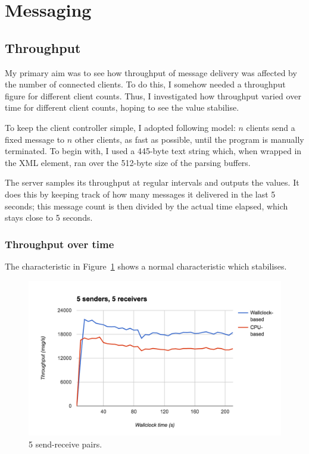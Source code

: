 \documentclass[12pt,a4paper,twoside,openright]{report}
\begin{document}
{\section{Messaging}
\subsection{Throughput}
My primary aim was to see how throughput of message delivery was affected by the number of connected clients. To do this, I somehow needed a throughput figure for different client counts. Thus, I investigated how throughput varied over time for different client counts, hoping to see the value stabilise.

To keep the client controller simple, I adopted following model: $n$ clients send a fixed message to $n$ other clients, as fast as possible, until the program is manually terminated. To begin with, I used a 445-byte text string which, when wrapped in the XML  element, ran over the 512-byte size of the parsing buffers.

The server samples its throughput at regular intervals and outputs the values. It does this by keeping track of how many messages it delivered in the last 5 seconds; this message count is then divided by the actual time elapsed, which stays close to 5 seconds.

\subsubsection{Throughput over time}
The characteristic in Figure~\ref{fig:5n5} shows a normal characteristic which stabilises.
\begin{figure}
  \centering\includegraphics[width=\textwidth]{../transcripts/lipsum/5n5/5n5.png}
  \caption{5 send-receive pairs.}
  \label{fig:5n5}
\end{figure}

}
\end{document}
